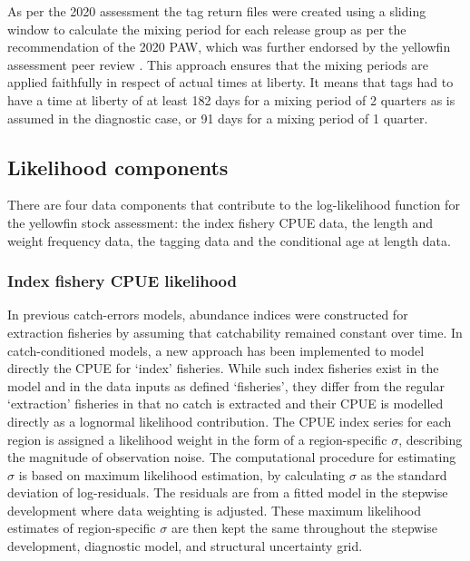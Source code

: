 As per the 2020 assessment the tag return files were created using a sliding window to calculate the mixing period for each release group as per the recommendation of the 2020 PAW, which was further endorsed by the yellowfin assessment peer review \citep{punt_independent_2023}. This approach ensures that the mixing periods are applied faithfully in respect of actual times at liberty. It means that tags had to have a time at liberty of at least 182 days for a mixing period of 2 quarters as is assumed in the diagnostic case, or 91 days for a mixing period of 1 quarter.

\subsection{Likelihood components}
\label{sec:likelihood_components}

There are four data components that contribute to the log-likelihood function for the yellowfin stock assessment: the index fishery CPUE data, the length and weight frequency data, the tagging data and the conditional age at length data.

\subsubsection{Index fishery CPUE likelihood}
\label{sec:indexCPUE_likelihood}

In previous catch-errors models, abundance indices were constructed for extraction fisheries by assuming that catchability remained constant over time. In catch-conditioned models, a new approach has been implemented to model directly the CPUE for `index' fisheries. While such index fisheries exist in the model and in the data inputs as defined `fisheries', they differ from the regular `extraction' fisheries in that no catch is extracted and their CPUE is modelled directly as a lognormal likelihood contribution. The CPUE index series for each region is assigned a likelihood weight in the form of a region-specific $\sigma$, describing the magnitude of observation noise. The computational procedure for estimating $\sigma$ is based on maximum likelihood estimation, by calculating $\sigma$ as the standard deviation of log-residuals. The residuals are from a fitted model in the stepwise development where data weighting is adjusted. These maximum likelihood estimates of region-specific $\sigma$ are then kept the same throughout the stepwise development, diagnostic model, and structural uncertainty grid.

